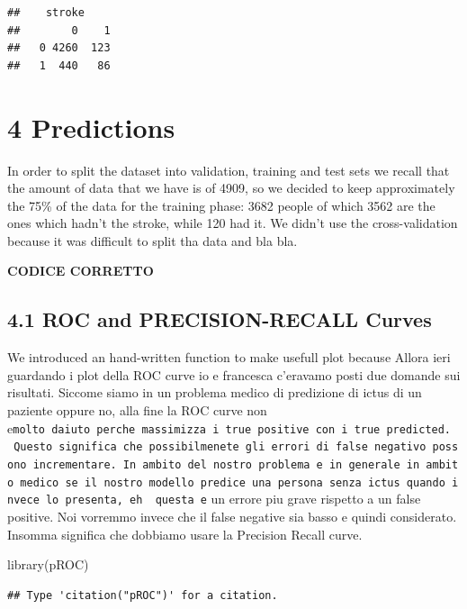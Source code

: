\documentclass[
]{article}
\newenvironment{Shaded}{\begin{snugshade}}{\end{snugshade}}
\newcommand{\FunctionTok}[1]{\textcolor[rgb]{0.00,0.00,0.00}{#1}}
\newcommand{\NormalTok}[1]{#1}
\begin{document}
\begin{verbatim}
##    stroke
##        0    1
##   0 4260  123
##   1  440   86
\end{verbatim}

\hypertarget{predictions}{%
\section{4 Predictions}\label{predictions}}

In order to split the dataset into validation, training and test sets we
recall that the amount of data that we have is of 4909, so we decided to
keep approximately the 75\% of the data for the training phase: 3682
people of which 3562 are the ones which hadn't the stroke, while 120 had
it. We didn't use the cross-validation because it was difficult to split
tha data and bla bla.

\textbf{CODICE CORRETTO}

\hypertarget{roc-and-precision-recall-curves}{%
\subsection{4.1 ROC and PRECISION-RECALL
Curves}\label{roc-and-precision-recall-curves}}

We introduced an hand-written function to make usefull plot because
Allora ieri guardando i plot della ROC curve io e francesca c'eravamo
posti due domande sui risultati. Siccome siamo in un problema medico di
predizione di ictus di un paziente oppure no, alla fine la ROC curve non
e\texttt{molto\ d\textquotesingle{}aiuto\ perche\ massimizza\ i\ true\ positive\ con\ i\ true\ predicted.\ \ Questo\ significa\ che\ possibilmenete\ gli\ errori\ di\ false\ negativo\ possono\ incrementare.\ In\ ambito\ del\ nostro\ problema\ e\ in\ generale\ in\ ambito\ medico\ se\ il\ nostro\ modello\ predice\ una\ persona\ senza\ ictus\ quando\ invece\ lo\ presenta,\ eh\ \ questa\ e}
un errore piu grave rispetto a un false positive. Noi vorremmo invece
che il false negative sia basso e quindi considerato. Insomma significa
che dobbiamo usare la Precision Recall curve.

\begin{Shaded}
\begin{Highlighting}[]
\FunctionTok{library}\NormalTok{(pROC)}
\end{Highlighting}
\end{Shaded}

\begin{verbatim}
## Type 'citation("pROC")' for a citation.
\end{verbatim}
\end{document}
